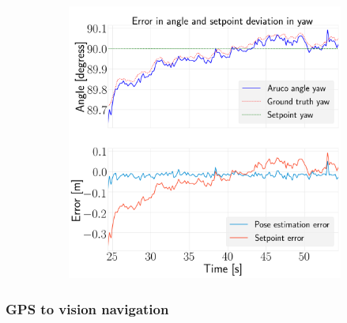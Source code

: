 \documentclass[../Head/report.tex]{subfiles}
\begin{document}
\begin{figure}[H]
\begin{subfigure}[t]{.30\textwidth}
        \caption{}
        \label{fig:hold_pose_estimation_test5_pitch}
    \end{subfigure}
     \hspace{0.2em}
    \begin{subfigure}[t]{.30\textwidth}
        \centering
        \includegraphics[width=\textwidth]{../Figures/hold_pose_using_aruco_pose_estimation/test5_landingBoard3_noWind/error_yaw/pose_error_yaw_test1.png}
        \caption{}
        \label{fig:hold_pose_estimation_test5_yaw}
    \end{subfigure}
    \caption{}
    \label{fig:hold_pose_estimation_test5_error_angle}
\end{figure}

\subsubsection{GPS to vision navigation}
\label{sec:gps2vision_transition}
\end{document}
